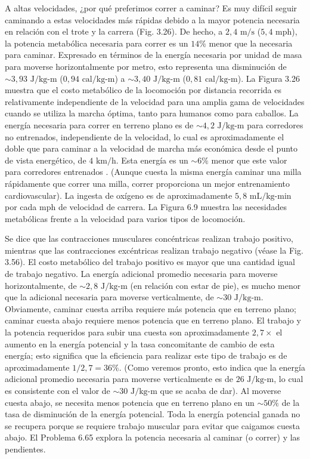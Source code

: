\documentclass[12pt]{book}
\begin{document}
A altas velocidades, ¿por qué preferimos correr a caminar? Es muy difícil seguir caminando a estas velocidades más rápidas debido a la mayor potencia necesaria en relación con el trote y la carrera (Fig. 3.26). De hecho, a $2,4\text{ m/s}$ ($5,4\text{ mph}$), la potencia metabólica necesaria para correr es un $14\%$ menor que la necesaria para caminar. Expresado en términos de la energía necesaria por unidad de masa para moverse horizontalmente por metro, esto representa una disminución de $\sim 3,93\text{ J/kg-m}$ ($0,94\text{ cal/kg-m}$) a $\sim 3,40\text{ J/kg-m}$ ($0,81\text{ cal/kg-m}$). La Figura 3.26 muestra que el costo metabólico de la locomoción por distancia recorrida es relativamente independiente de la velocidad para una amplia gama de velocidades cuando se utiliza la marcha óptima, tanto para humanos como para caballos. La energía necesaria para correr en terreno plano es de $\sim 4,2\text{ J/kg-m}$ para corredores no entrenados, independiente de la velocidad, lo cual es aproximadamente el doble que para caminar a la velocidad de marcha más económica desde el punto de vista energético, de $4\text{ km/h}$. Esta energía es un $\sim 6\%$ menor que este valor para corredores entrenados \cite{60}. (Aunque cuesta la misma energía caminar una milla rápidamente que correr una milla, correr proporciona un mejor entrenamiento cardiovascular). La ingesta de oxígeno es de aproximadamente $5,8\text{ mL/kg-min}$ por cada mph de velocidad de carrera. La Figura 6.9 muestra las necesidades metabólicas frente a la velocidad para varios tipos de locomoción.

Se dice que las contracciones musculares concéntricas realizan trabajo positivo, mientras que las contracciones excéntricas realizan trabajo negativo (véase la Fig. 3.56). El costo metabólico del trabajo positivo es mayor que una cantidad igual de trabajo negativo. La energía adicional promedio necesaria para moverse horizontalmente, de $\sim 2,8\text{ J/kg-m}$ (en relación con estar de pie), es mucho menor que la adicional necesaria para moverse verticalmente, de $\sim 30\text{ J/kg-m}$. Obviamente, caminar cuesta arriba requiere más potencia que en terreno plano; caminar cuesta abajo requiere menos potencia que en terreno plano. El trabajo y la potencia requeridos para subir una cuesta son aproximadamente $2,7 \times$ el aumento en la energía potencial y la tasa concomitante de cambio de esta energía; esto significa que la eficiencia para realizar este tipo de trabajo es de aproximadamente $1/2,7 = 36\%$. (Como veremos pronto, esto indica que la energía adicional promedio necesaria para moverse verticalmente es de $26\text{ J/kg-m}$, lo cual es consistente con el valor de $\sim 30\text{ J/kg-m}$ que se acaba de dar). Al moverse cuesta abajo, se necesita menos potencia que en terreno plano en un $\sim 50\%$ de la tasa de disminución de la energía potencial. Toda la energía potencial ganada no se recupera porque se requiere trabajo muscular para evitar que caigamos cuesta abajo. El Problema 6.65 explora la potencia necesaria al caminar (o correr) y las pendientes.
\end{document}
